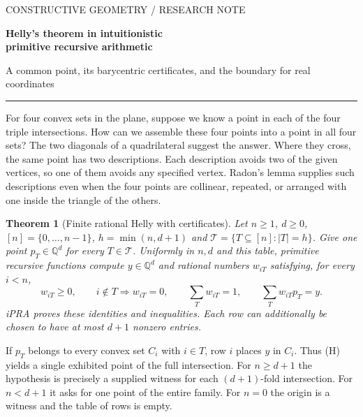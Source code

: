 \documentclass[11pt,letterpaper]{article}
\newcommand{\Q}{\mathbb Q}\newcommand{\R}{\mathbb R}\newcommand{\N}{\mathbb N}
\theoremstyle{packet}\newtheorem{theorem}{Theorem}\newtheorem{lem}[theorem]{Lemma}
\begin{document}
\thispagestyle{plain}
{\color{tealproof}\sffamily\fontsize{10}{12}\selectfont CONSTRUCTIVE GEOMETRY \quad / \quad RESEARCH NOTE}\par
\vspace{0.16in}
{\sffamily\bfseries\color{ink}\fontsize{29}{33}\selectfont Helly's theorem in intuitionistic\\primitive recursive arithmetic\par}
\vspace{0.11in}
{\large A common point, its barycentric certificates, and the boundary for real coordinates}\par
\vspace{0.08in}\textcolor{tealproof}{\rule{\textwidth}{1.1pt}}

For four convex sets in the plane, suppose we know a point in each of the four triple intersections. How can we assemble these four points into a point in all four sets? The two diagonals of a quadrilateral suggest the answer. Where they cross, the same point has two descriptions. Each description avoids two of the given vertices, so one of them avoids any specified vertex. Radon's lemma \cite{radon} supplies such descriptions even when the four points are collinear, repeated, or arranged with one inside the triangle of the others.

\begin{theorem}[Finite rational Helly with certificates]\label{thm:main}
Let $n\ge1$, $d\ge0$, $[n]=\{0,\ldots,n-1\}$, $h=\min(n,d+1)$ and
$\mathcal T=\{T\subseteq[n]: |T|=h\}$. Give one point $p_T\in\Q^d$ for every $T\in\mathcal T$. Uniformly in $n,d$ and this table, primitive recursive functions compute $y\in\Q^d$ and rational numbers $w_{iT}$ satisfying, for every $i<n$,
\begin{equation}
  w_{iT}\ge0,\qquad i\notin T\Rightarrow w_{iT}=0,\qquad
  \sum_T w_{iT}=1,\qquad \sum_T w_{iT}p_T=y.\tag{H}\label{eq:helly}
\end{equation}
iPRA proves these identities and inequalities. Each row can additionally be chosen to have at most $d+1$ nonzero entries.
\end{theorem}

If $p_T$ belongs to every convex set $C_i$ with $i\in T$, row $i$ places $y$ in $C_i$. Thus (H) yields a single exhibited point of the full intersection. For $n\ge d+1$ the hypothesis is precisely a supplied witness for each $(d+1)$-fold intersection. For $n<d+1$ it asks for one point of the entire family. For $n=0$ the origin is a witness and the table of rows is empty.
\end{document}
